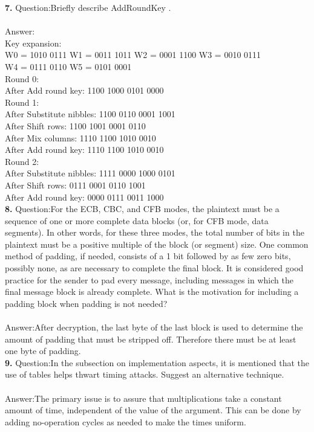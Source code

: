 \documentclass[paper=a4, fontsize=11pt]{scrartcl} %
\numberwithin{equation}{section} %
\numberwithin{figure}{section} %
\numberwithin{table}{section} %
\begin{document}
\textbf{7.} Question:Briefly describe AddRoundKey .\\\\
  Answer:\\
  Key expansion:\\
                W0 = 1010 0111 W1 = 0011 1011 W2 = 0001 1100 W3 = 0010 0111\\
                W4 = 0111 0110 W5 = 0101 0001\\
        Round 0:\\
                After Add round key: 1100 1000 0101 0000\\
        Round 1:\\
                After Substitute nibbles: 1100 0110 0001 1001\\
                After Shift rows: 1100 1001 0001 0110\\
                After Mix columns: 1110 1100 1010 0010\\
                After Add round key: 1110 1100 1010 0010\\
        Round 2:\\
                After Substitute nibbles: 1111 0000 1000 0101\\
                After Shift rows: 0111 0001 0110 1001\\
                After Add round key: 0000 0111 0011 1000 \\

\textbf{8.} Question:For the ECB, CBC, and CFB modes, the plaintext must be a sequence of one or more complete data blocks (or, for CFB mode, data segments). In other words, for these three modes, the total number of bits in the plaintext must be a positive multiple of the block (or segment) size. One common method of padding, if needed, consists of a 1 bit followed by as few zero bits, possibly none, as are necessary to complete the final block. It is considered good practice for the sender to pad every message, including messages in which the final message block is already complete. What is the motivation for including a padding block when padding is not needed? \\\\
  Answer:After decryption, the last byte of the last block is used to determine the amount of padding that must be stripped off. Therefore there must be at least one byte of padding.\\

\textbf{9.} Question:In the subsection on implementation aspects, it is mentioned that the use of tables helps thwart timing attacks. Suggest an alternative technique. \\\\
  Answer:The primary issue is to assure that multiplications take a constant amount of time, independent of the value of the argument. This can be done by adding no-operation cycles as needed to make the times uniform.\\
\end{document}
